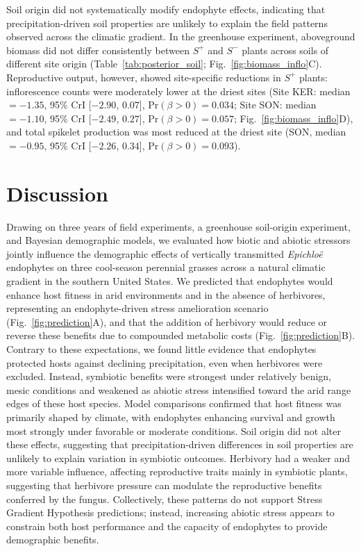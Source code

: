 \documentclass[12pt]{article}\usepackage[]{graphicx}\usepackage[dvipsnames]{xcolor}
\begin{document}
Soil origin did not systematically modify endophyte effects, indicating that precipitation-driven soil properties are unlikely to explain the field patterns observed across the climatic gradient.
In the greenhouse experiment, aboveground biomass did not differ consistently between $S^{+}$ and $S^{-}$ plants across soils of different site origin (Table~\ref{tab:posterior_soil}; Fig.~\ref{fig:biomass_inflo}C).
Reproductive output, however, showed site-specific reductions in $S^{+}$ plants: inflorescence counts were moderately lower at the driest sites (Site KER: median $= -1.35$, 95\% CrI [$-2.90$, $0.07$], $\mathrm{Pr}(\beta > 0) = 0.034$; Site SON: median $= -1.10$, 95\% CrI [$-2.49$, $0.27$], $\mathrm{Pr}(\beta > 0) = 0.057$; Fig.~\ref{fig:biomass_inflo}D), and total spikelet production was most reduced at the driest site (SON, median $= -0.95$, 95\% CrI [$-2.26$, $0.34$], $\mathrm{Pr}(\beta > 0) = 0.093$).

\section*{Discussion}

Drawing on three years of field experiments, a greenhouse soil-origin experiment, and Bayesian demographic models, we evaluated how biotic and abiotic stressors jointly influence the demographic effects of vertically transmitted \textit{Epichloë} endophytes on three cool-season perennial grasses across a natural climatic gradient in the southern United States. 
We predicted that endophytes would enhance host fitness in arid environments and in the absence of herbivores, representing an endophyte-driven stress amelioration scenario (Fig.~\ref{fig:prediction}A), and that the addition of herbivory would reduce or reverse these benefits due to compounded metabolic costs (Fig.~\ref{fig:prediction}B). 
Contrary to these expectations, we found little evidence that endophytes protected hosts against declining precipitation, even when herbivores were excluded. Instead, symbiotic benefits were strongest under relatively benign, mesic conditions and weakened as abiotic stress intensified toward the arid range edges of these host species. 
Model comparisons confirmed that host fitness was primarily shaped by climate, with endophytes enhancing survival and growth most strongly under favorable or moderate conditions.
 Soil origin did not alter these effects, suggesting that precipitation-driven differences in soil properties are unlikely to explain variation in symbiotic outcomes.
Herbivory had a weaker and more variable influence, affecting reproductive traits mainly in symbiotic plants, suggesting that herbivore pressure can modulate the reproductive benefits conferred by the fungus. 
Collectively, these patterns do not support Stress Gradient Hypothesis predictions; instead, increasing abiotic stress appears to constrain both host performance and the capacity of endophytes to provide demographic benefits.
\end{document}
